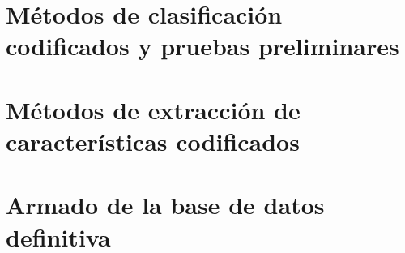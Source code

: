 \documentclass[12pt,bibliography=openstyle,DIV=12,parskip=half-]{scrartcl}
\begin{document}
\section{Métodos de clasificación codificados y pruebas preliminares}
\section{Métodos de extracción de características codificados}
\section{Armado de la base de datos definitiva}

%
%
\printbibliography
%
\end{document}
